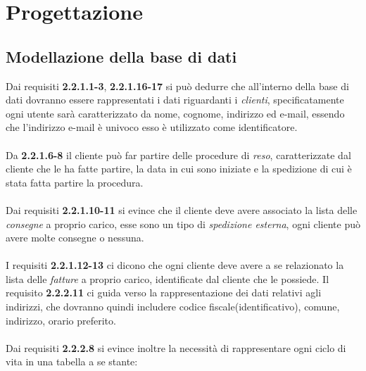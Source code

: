 \documentclass[a4paper,12pt]{article}
\begin{document}
\newpage
\section{Progettazione}
\subsection{Modellazione della base di dati}
Dai requisiti \textbf{2.2.1.1-3}, \textbf{2.2.1.16-17} si può dedurre che all'interno della base di dati dovranno essere rappresentati i dati riguardanti i \textit{clienti}, specificatamente ogni utente sarà caratterizzato da nome, cognome, indirizzo ed e-mail, essendo che l'indirizzo e-mail è univoco esso è utilizzato come identificatore. 
\\\\
Da \textbf{2.2.1.6-8} il cliente può far partire delle procedure di \textit{reso}, caratterizzate dal cliente che le ha fatte partire, la data in cui sono iniziate e la spedizione di cui è stata fatta partire la procedura.
\\\\
Dai requisiti \textbf{2.2.1.10-11} si evince che il cliente deve avere associato la lista delle \textit{consegne} a proprio carico, esse sono un tipo di \textit{spedizione esterna}, ogni cliente può avere molte consegne o nessuna.
\\\\
I requisiti \textbf{2.2.1.12-13} ci dicono che ogni cliente deve avere a se relazionato la lista delle \textit{fatture} a proprio carico, identificate dal cliente che le possiede.
Il requisito \textbf{2.2.2.11} ci guida verso la rappresentazione dei dati relativi agli indirizzi, che dovranno quindi includere codice fiscale(identificativo), comune,
indirizzo, orario preferito. \\ \\
Dai requisiti \textbf{2.2.2.8} si evince inoltre la necessità di rappresentare ogni ciclo di vita in una tabella a se stante:
\end{document}
